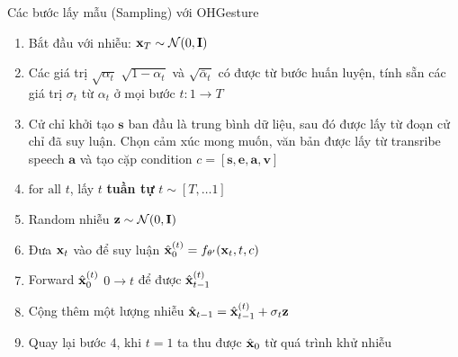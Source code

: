 %	
%	
%	
%
%	



\begin{frame}{Các bước lấy mẫu (Sampling) với OHGesture}
	
	\begin{enumerate}
		\item Bắt đầu với nhiễu: $\mathbf{x}_T \sim \mathcal{N}(0, \mathbf{I})$
		\item Các giá trị $\sqrt{\alpha_t}$ $\sqrt{1 - \alpha_t}$ và $\sqrt{\bar{\alpha}_t}$ có được từ bước huấn luyện, tính sẵn các giá trị  $\sigma_t$ từ $\alpha_t$ ở mọi bước $t: 1 \rightarrow T$
		\item Cử chỉ khởi tạo $\mathbf{s}$ ban đầu là trung bình dữ liệu, sau đó được lấy từ đoạn cử chỉ đã suy luận. Chọn cảm xúc mong muốn, văn bản được lấy từ transribe speech $\mathbf{a}$ và tạo cặp condition $c = [\mathbf{s}, \mathbf{e}, \mathbf{a},  \mathbf{v}]$
		\item $\text{for all}$ $t$, lấy $t$ \textbf{tuần tự} $t \sim [T, \dots 1]$
		\item Random nhiễu $\mathbf{z} \sim \mathcal{N}(0, \mathbf{I})$
		\item Đưa $\mathbf{x}_t$ vào để suy luận $\hat{\mathbf{x}}_0^{(t)} = f_{\theta'}(\mathbf{x}_t, t, c)$
		\item Forward $\hat{\mathbf{x}}_0^{(t)}$ $0 \rightarrow t$ để được $\hat{\mathbf{x}}_{t-1}^{(t)}$
		\item Cộng thêm một lượng nhiễu $\hat{\mathbf{x}}_{t-1} = \hat{\mathbf{x}}_{t-1}^{(t)} + \sigma_t \mathbf{z}$
		\item Quay lại bước $4$, khi $t=1$ ta thu được $\hat{\mathbf{x}}_0$ từ quá trình khử nhiễu
	\end{enumerate}
\end{frame}

